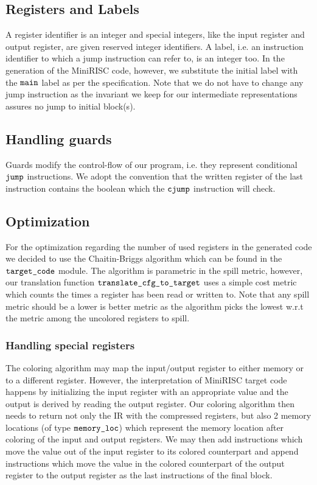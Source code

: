 \documentclass[a4paper,11pt]{report}
\begin{document}
\subsection{Registers and Labels}
A register identifier is an integer and special integers, like the input register and output register, are given reserved integer identifiers. 
A label, i.e. an instruction identifier to which a jump instruction can refer to, is an integer too. In the generation of the MiniRISC code, however, we substitute the initial label with the $\verb|main|$ label as per the specification. Note that we do not have to change any jump instruction as the invariant we keep for our intermediate representations assures no jump to initial block(s).

\subsection{Handling guards}

Guards modify the control-flow of our program, i.e. they represent conditional $\verb|jump|$ instructions. We adopt the convention that the written register of the last instruction contains the boolean which the $\verb|cjump|$ instruction will check. 

\subsection{Optimization}

For the optimization regarding the number of used registers in the generated code we decided to use the Chaitin-Briggs algorithm which can be found in the $\verb|target_code|$ module. The algorithm is parametric in the spill metric, however, our translation function $\verb|translate_cfg_to_target|$ uses a simple cost metric which counts the times a register has been read or written to.
Note that any spill metric should be a lower is better metric as the algorithm picks the lowest w.r.t the metric among the uncolored registers to spill.

\subsubsection{Handling special registers}

The coloring algorithm may map the input/output register to either memory or to a different register. However, the interpretation of MiniRISC target code happens by initializing the input register with an appropriate value and the output is derived by reading the output register. Our coloring algorithm then needs to return not only the IR with the compressed registers, but also 2 memory locations (of type $\verb|memory_loc|$) which represent the memory location after coloring of the input and output registers. We may then add instructions which move the value out of the input register to its colored counterpart and append instructions which move the value in the colored counterpart of the output register to the output register as the last instructions of the final block.
\end{document}
